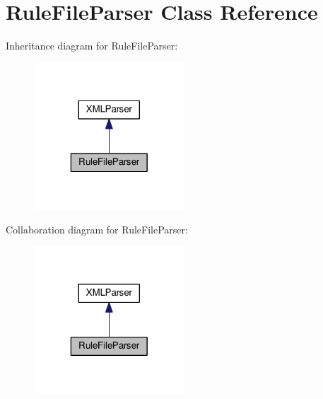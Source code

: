 \hypertarget{classRuleFileParser}{}\section{Rule\+File\+Parser Class Reference}
\label{classRuleFileParser}


Inheritance diagram for Rule\+File\+Parser\+:
\nopagebreak
\begin{figure}[H]
\begin{center}
\leavevmode
\includegraphics[width=160pt]{classRuleFileParser__inherit__graph}
\end{center}
\end{figure}


Collaboration diagram for Rule\+File\+Parser\+:
\nopagebreak
\begin{figure}[H]
\begin{center}
\leavevmode
\includegraphics[width=160pt]{classRuleFileParser__coll__graph}
\end{center}
\end{figure}
